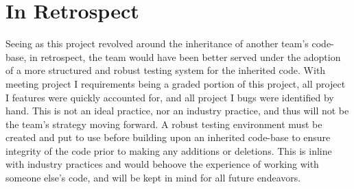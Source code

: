 \documentclass[12pt]{report}
\begin{document}
\section*{In Retrospect}
Seeing as this project revolved around the inheritance of another team's code-base, in retrospect, the team would have been better served under the adoption of a more structured and robust testing system for the inherited code. With meeting project I requirements being a graded portion of this project, all project I features were quickly accounted for, and all project I bugs were identified by hand. This is not an ideal practice, nor an industry practice, and thus will not be the team's strategy moving forward. A robust testing environment must be created and put to use before building upon an inherited code-base to ensure integrity of the code prior to making any additions or deletions. This is inline with industry practices and would behoove the experience of working with someone else's code, and will be kept in mind for all future endeavors.
\end{document}
